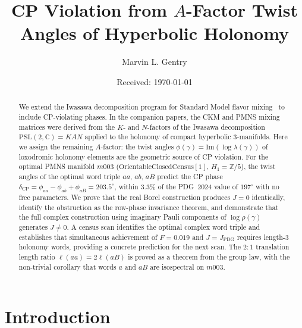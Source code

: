 ﻿\documentclass[epjc3]{svjour3}
\begin{document}
\title{CP Violation from $A$-Factor Twist Angles of Hyperbolic Holonomy}

\author{Marvin L. Gentry}


\date{Received: \today}

\maketitle

\begin{abstract}
We extend the Iwasawa decomposition program for Standard Model flavor
mixing~\cite{Gentry2026c,Gentry2026b} to include CP-violating phases.
In the companion papers, the CKM and PMNS mixing matrices were derived
from the $K$- and $N$-factors of the Iwasawa decomposition
$\mathrm{PSL}(2,\mathbb{C}) = KAN$ applied to the holonomy of compact
hyperbolic 3-manifolds.  Here we assign the remaining $A$-factor: the
twist angles $\phi(\gamma) = \mathrm{Im}(\log\lambda(\gamma))$ of
loxodromic holonomy elements are the geometric source of CP violation.
For the optimal PMNS manifold $m003$
($\mathrm{OrientableClosedCensus}[1]$, $H_1 = \mathbb{Z}/5$), the
twist angles of the optimal word triple $aa$, $ab$, $aB$ predict the
CP phase
$\delta_{\mathrm{CP}} = \phi_{aa} - \phi_{ab} + \phi_{aB} = 203.5^\circ$,
within 3.3\% of the PDG~2024 value of $197^\circ$ with no free
parameters.  We prove that the real Borel construction produces $J=0$
identically, identify the obstruction as the row-phase invariance
theorem, and demonstrate that the full complex construction using
imaginary Pauli components of $\log\rho(\gamma)$ generates $J\neq 0$.
A census scan identifies the optimal complex word triple and
establishes that simultaneous achievement of $F = 0.019$ and
$J = J_{\mathrm{PDG}}$ requires length-3 holonomy words, providing a
concrete prediction for the next scan.  The $2\!:\!1$ translation
length ratio $\ell(aa) = 2\ell(aB)$ is proved as a theorem from the
group law, with the non-trivial corollary that words $a$ and $aB$ are
isospectral on $m003$.
\end{abstract}

\section{Introduction}
\label{sec:intro}
\end{document}
